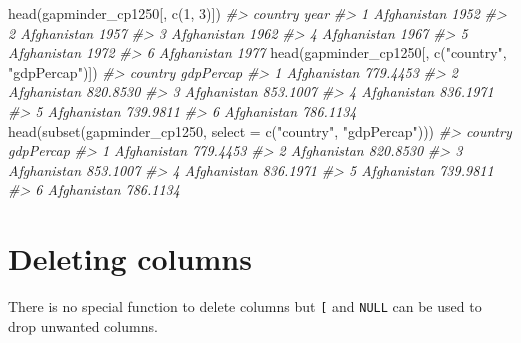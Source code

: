 \documentclass[
]{book}
\newenvironment{Shaded}{\begin{snugshade}}{\end{snugshade}}
\newcommand{\AttributeTok}[1]{\textcolor[rgb]{0.77,0.63,0.00}{#1}}
\newcommand{\CommentTok}[1]{\textcolor[rgb]{0.56,0.35,0.01}{\textit{#1}}}
\newcommand{\DecValTok}[1]{\textcolor[rgb]{0.00,0.00,0.81}{#1}}
\newcommand{\FunctionTok}[1]{\textcolor[rgb]{0.00,0.00,0.00}{#1}}
\newcommand{\NormalTok}[1]{#1}
\newcommand{\StringTok}[1]{\textcolor[rgb]{0.31,0.60,0.02}{#1}}
\begin{document}
\begin{Shaded}
\begin{Highlighting}[]
\FunctionTok{head}\NormalTok{(gapminder\_cp1250[, }\FunctionTok{c}\NormalTok{(}\DecValTok{1}\NormalTok{, }\DecValTok{3}\NormalTok{)])}
\CommentTok{\#\textgreater{}       country year}
\CommentTok{\#\textgreater{} 1 Afghanistan 1952}
\CommentTok{\#\textgreater{} 2 Afghanistan 1957}
\CommentTok{\#\textgreater{} 3 Afghanistan 1962}
\CommentTok{\#\textgreater{} 4 Afghanistan 1967}
\CommentTok{\#\textgreater{} 5 Afghanistan 1972}
\CommentTok{\#\textgreater{} 6 Afghanistan 1977}
\FunctionTok{head}\NormalTok{(gapminder\_cp1250[, }\FunctionTok{c}\NormalTok{(}\StringTok{"country"}\NormalTok{, }\StringTok{"gdpPercap"}\NormalTok{)])}
\CommentTok{\#\textgreater{}       country gdpPercap}
\CommentTok{\#\textgreater{} 1 Afghanistan  779.4453}
\CommentTok{\#\textgreater{} 2 Afghanistan  820.8530}
\CommentTok{\#\textgreater{} 3 Afghanistan  853.1007}
\CommentTok{\#\textgreater{} 4 Afghanistan  836.1971}
\CommentTok{\#\textgreater{} 5 Afghanistan  739.9811}
\CommentTok{\#\textgreater{} 6 Afghanistan  786.1134}
\FunctionTok{head}\NormalTok{(}\FunctionTok{subset}\NormalTok{(gapminder\_cp1250, }\AttributeTok{select =} \FunctionTok{c}\NormalTok{(}\StringTok{"country"}\NormalTok{, }\StringTok{"gdpPercap"}\NormalTok{)))}
\CommentTok{\#\textgreater{}       country gdpPercap}
\CommentTok{\#\textgreater{} 1 Afghanistan  779.4453}
\CommentTok{\#\textgreater{} 2 Afghanistan  820.8530}
\CommentTok{\#\textgreater{} 3 Afghanistan  853.1007}
\CommentTok{\#\textgreater{} 4 Afghanistan  836.1971}
\CommentTok{\#\textgreater{} 5 Afghanistan  739.9811}
\CommentTok{\#\textgreater{} 6 Afghanistan  786.1134}
\end{Highlighting}
\end{Shaded}

\hypertarget{deleting-columns}{%
\section{Deleting columns}\label{deleting-columns}}

There is no special function to delete columns but \texttt{{[}} and \texttt{NULL} can be used to drop unwanted columns.
\end{document}
